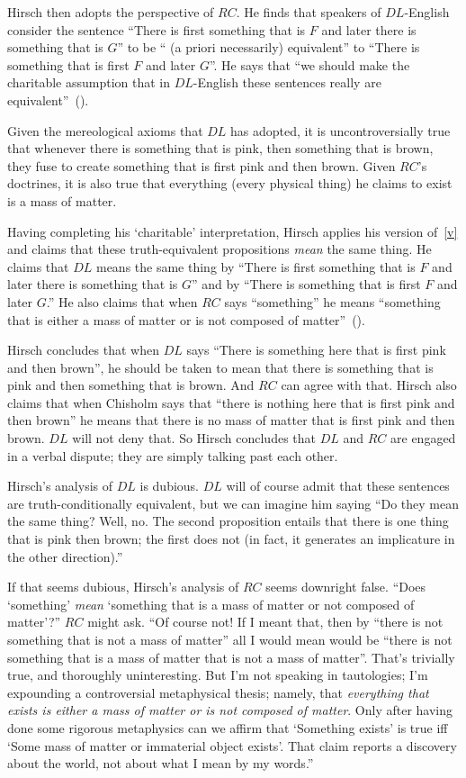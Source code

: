 \documentclass[11pt]{article}
\begin{document}
\begin{spacing}{1.25}
Hirsch then adopts the perspective of $RC$.  He finds that speakers of
$DL$-English consider the sentence ``There is first something that is
$F$ and later there is something that is $G$'' to be `` (a priori
necessarily) equivalent'' to ``There is something that is first $F$
and later $G$''.  He says that ``we should make the charitable
assumption that in $DL$-English these sentences really are
equivalent''~(\citeyear[78]{hirsch2005}).

Given the mereological axioms that $DL$ has adopted, it is
uncontroversially true that whenever there is something that is pink,
then something that is brown, they fuse to create something that is
first pink and then brown.  Given $RC$'s doctrines, it is also
true that everything (every physical thing) he claims to exist is a
mass of matter.

Having completing his `charitable' interpretation, Hirsch applies his
version of~\ref{v} and claims that these truth-equivalent propositions
{\em mean} the same thing.  He claims that $DL$ means the same thing
by ``There is first something that is $F$ and later there is something
that is $G$'' and by ``There is something that is first $F$ and later
$G$.''  He also claims that when $RC$ says ``something'' he means
``something that is either a mass of matter or is not composed of
matter''~(\citeyear[76]{hirsch2005}).

Hirsch concludes that when $DL$ says ``There is something here that is
first pink and then brown'', he should be taken to mean that there is
something that is pink and then something that is brown.  And $RC$ can
agree with that.  Hirsch also claims that when Chisholm says that
``there is nothing here that is first pink and then brown'' he means
that there is no mass of matter that is first pink and then
brown.  $DL$ will not deny that.  So Hirsch concludes that $DL$ and
$RC$ are engaged in a verbal dispute; they are simply talking past
each other.

Hirsch's analysis of $DL$ is dubious.  $DL$ will of course admit that
these sentences are truth-conditionally equivalent, but we can imagine
him saying ``Do they mean the same thing?  Well, no.  The second
proposition entails that there is one thing that is pink then brown;
the first does not (in fact, it generates an implicature in the other
direction).''

If that seems dubious, Hirsch's analysis of $RC$ seems downright
false.  ``Does `something' {\em mean} `something that is a mass of
matter or not composed of matter'?''  $RC$ might ask.  ``Of course
not!  If I meant that, then by ``there is not something that is not a
mass of matter'' all I would mean would be ``there is not something
that is a mass of matter that is not a mass of matter''.  That's
trivially true, and thoroughly uninteresting.  But I'm not speaking in
tautologies; I'm expounding a controversial metaphysical thesis;
namely, that {\em everything that exists is either a mass of matter or
  is not composed of matter}.  Only after having done some rigorous
metaphysics can we affirm that `Something exists' is true iff `Some
mass of matter or immaterial object exists'.  That claim reports a
discovery about the world, not about what I mean by my words.''


\end{spacing}
\end{document}
